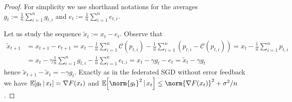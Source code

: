 \documentclass{article}
\begin{document}
\begin{proof}
  For simplicity we use shorthand notations for the averages $g_t := \frac{1}{n} \sum_{i=1}^n g_{t,i}$ and $e_t := \frac{1}{n} \sum_{i=1}^n e_{t,i}$.

  Let us study the sequence $\tilde x_t := x_t - e_t$. Observe that
  \begin{align*}
    \tilde x_{t+1}
     & =
    x_{t+1} - e_{t+1}
    =
    x_t - \frac{1}{n} \sum_{i=1}^n \mathcal C(p_{t,i}) - \frac{1}{n} \sum_{i=1}^n (p_{t,i} - \mathcal C(p_{t,i}))
    =
    x_t - \frac{1}{n} \sum_{i=1}^n p_{t,i}
    \\
     & =
    x_t - \gamma  \frac{1}{n} \sum_{i=1}^n g_{t,i} - \frac{1}{n} \sum_{i=1}^n e_{t,i}
    =
    x_t - \gamma g_t - e_t
    =
    \tilde x_t - \gamma g_t
  \end{align*}
  hence $\tilde x_{t+1} - \tilde x_t = -\gamma g_t$. Exactly as in the federated SGD without error feedback we have $\mathbb{\operatorname{\mathbb{E}}}_{\!\!}\left[g_t \,|\, x_t\right] = \nabla F(x_t)$ and $\expec{\norm{g_t}^2 \,|\, x_t} \leq \norm{\nabla F(x_t)}^2 + \sigma^2/n$.


\end{proof}
\end{document}
